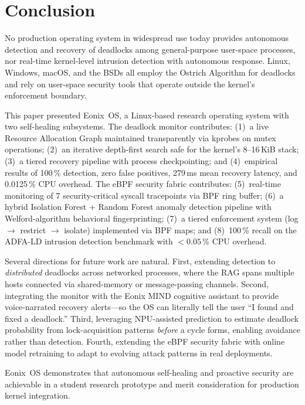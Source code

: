 \documentclass[11pt,letterpaper]{article}
\begin{document}
\section{Conclusion}

No production operating system in widespread use today provides
autonomous detection and recovery of deadlocks among general-purpose
user-space processes, nor real-time kernel-level intrusion detection
with autonomous response.  Linux, Windows, macOS, and the BSDs all
employ the Ostrich Algorithm for deadlocks and rely on user-space
security tools that operate outside the kernel's enforcement boundary.

This paper presented Eonix~OS, a Linux-based research operating system
with two self-healing subsystems.  The deadlock monitor contributes:
(1)~a live Resource Allocation Graph maintained transparently via
kprobes on mutex operations; (2)~an iterative depth-first search safe
for the kernel's 8--16\,KiB stack; (3)~a tiered recovery pipeline with
process checkpointing; and (4)~empirical results of 100\,\% detection,
zero false positives, 279\,ms mean recovery latency, and 0.0125\,\%
CPU overhead.  The eBPF security fabric contributes: (5)~real-time
monitoring of 7 security-critical syscall tracepoints via BPF ring
buffer; (6)~a hybrid Isolation Forest + Random Forest anomaly detection
pipeline with Welford-algorithm behavioral fingerprinting; (7)~a tiered
enforcement system (log $\to$ restrict $\to$ isolate) implemented via
BPF maps; and (8)~100\,\% recall on the ADFA-LD intrusion detection
benchmark with $< 0.05$\,\% CPU overhead.

Several directions for future work are natural.  First, extending
detection to \emph{distributed} deadlocks across networked processes,
where the RAG spans multiple hosts connected via shared-memory or
message-passing channels.  Second, integrating the monitor with the
Eonix MIND cognitive assistant to provide voice-narrated recovery
alerts---so the OS can literally tell the user ``I found and fixed a
deadlock.''  Third, leveraging NPU-assisted prediction to estimate
deadlock probability from lock-acquisition patterns \emph{before} a
cycle forms, enabling avoidance rather than detection.  Fourth,
extending the eBPF security fabric with online model retraining to
adapt to evolving attack patterns in real deployments.

Eonix~OS demonstrates that autonomous self-healing and proactive
security are achievable in a student research prototype and merit
consideration for production kernel integration.
\end{document}
